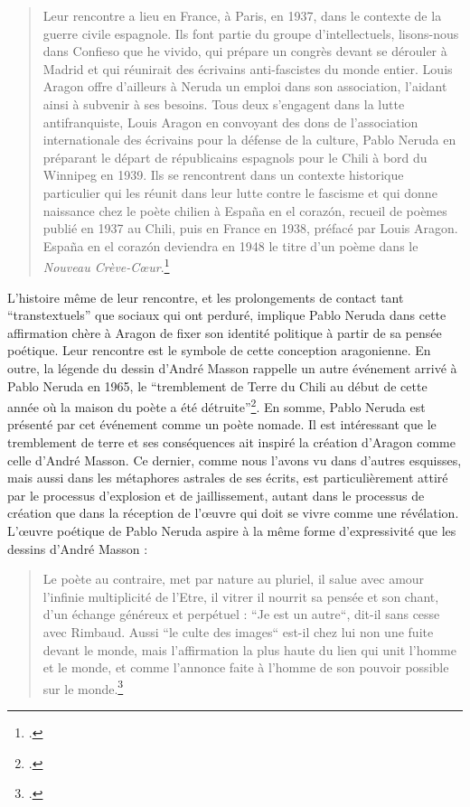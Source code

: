 \begin{quote}
Leur rencontre a lieu en France, à Paris, en 1937, dans le contexte de la guerre civile espagnole. Ils font partie du groupe d’intellectuels, lisons-nous dans Confieso que he vivido, qui prépare un congrès devant se dérouler à Madrid et qui réunirait des écrivains anti-fascistes du monde entier. Louis Aragon offre d’ailleurs à Neruda un emploi dans son association, l’aidant ainsi à subvenir à ses besoins. Tous deux s’engagent dans la lutte antifranquiste, Louis Aragon en convoyant des dons de l’association internationale des écrivains pour la défense de la culture, Pablo Neruda en préparant le départ de républicains espagnols pour le Chili à bord du Winnipeg en 1939. Ils se rencontrent dans un contexte historique particulier qui les réunit dans leur lutte contre le fascisme et qui donne naissance chez le poète chilien à España en el corazón, recueil de poèmes publié en 1937 au Chili, puis en France en 1938, préfacé par Louis Aragon. España en el corazón deviendra en 1948 le titre d’un poème dans le \emph{Nouveau Crève-Cœur}.\footcite{aragonaneruda}\end{quote}	 

L’histoire même de leur rencontre, et les prolongements de contact tant \enquote{transtextuels} que sociaux qui ont perduré, implique Pablo Neruda dans cette affirmation chère à Aragon de fixer son identité politique à partir de sa pensée poétique. Leur rencontre est le symbole de cette conception aragonienne. En outre, la légende du dessin d’André Masson rappelle un autre événement arrivé à Pablo Neruda en 1965, le \enquote{tremblement de Terre du Chili au début de cette année où la maison du poète a été détruite}\footcite{pabloneruda}. En somme, Pablo Neruda est présenté par cet événement comme un poète nomade. Il est intéressant que le tremblement de terre et ses conséquences ait inspiré la création d’Aragon comme celle d’André Masson. Ce dernier, comme nous l’avons vu dans d’autres esquisses, mais aussi dans les métaphores astrales de ses écrits, est particulièrement attiré par le processus d’explosion et de jaillissement, autant dans le processus de création que dans la réception de l’\oe{}uvre qui doit se vivre comme une révélation. L’\oe{}uvre poétique de Pablo Neruda aspire à la même forme d’expressivité que les dessins d’André Masson :

\begin{quote}
Le poète au contraire, met par nature au pluriel, il salue avec amour l’infinie multiplicité de l’Etre, il vitrer il nourrit sa pensée et son chant, d’un échange généreux et perpétuel : “Je est un autre“, dit-il sans cesse avec Rimbaud. Aussi “le culte des images“ est-il chez lui non une fuite devant le monde, mais l’affirmation la plus haute du lien qui unit l’homme et le monde, et comme l’annonce faite à l’homme de son pouvoir possible sur le monde.\footcite{marcenac2004pablo}\end{quote}	


